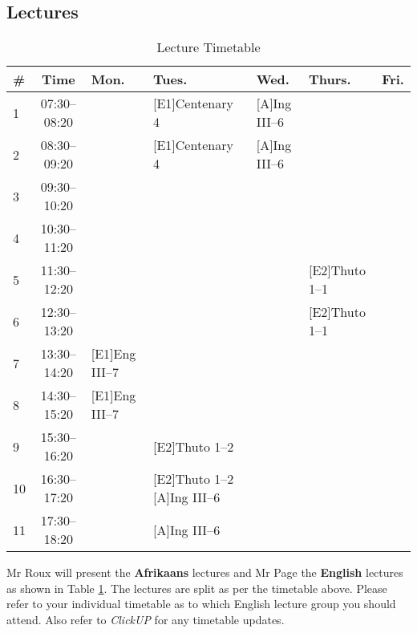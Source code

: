     \subsection{Lectures}
        \begin{table}[!h]
            \begin{center}
             \begin{tabular}{|l|c|p{2.5cm}|p{2.9cm}|p{2.1cm}|p{2.6cm}|p{0.6cm}|}
                 \hline
                 {\bf \#} & {\bf Time} & {\bf Mon.} & {\bf Tues.} & {\bf Wed.} &
                 {\bf Thurs.} & {\bf Fri.} \\
                 \hline
                 1  & 07:30--08:20 &  & [E1]Centenary 4 & [A]Ing III--6 &  & \\ \hline
                 2  & 08:30--09:20 &  & [E1]Centenary 4 & [A]Ing III--6 &  & \\ \hline
                 3  & 09:30--10:20 &  &  &  &  & \\ \hline
                 4  & 10:30--11:20 &  &  &  &  & \\ \hline
                 5  & 11:30--12:20 &  &  &  & [E2]Thuto 1--1 & \\ \hline
                 6  & 12:30--13:20 &  &  &  & [E2]Thuto 1--1 & \\ \hline
                 7  & 13:30--14:20 & [E1]Eng III--7 &  &  &  & \\ \hline
                 8  & 14:30--15:20 & [E1]Eng III--7 &  &  &  & \\ \hline
                 9  & 15:30--16:20 &  & [E2]Thuto 1--2 &  &  & \\ \hline
                 10 & 16:30--17:20 &  & [E2]Thuto 1--2 [A]Ing III--6 &  &  & \\ \hline
                 11 & 17:30--18:20 &  & [A]Ing III--6 &  &  & \\
                 \hline
             \end{tabular}
             \caption{Lecture Timetable}
            \label{tab:lectures}
            \end{center}
        \end{table}

        Mr Roux will present the \textbf{Afrikaans} lectures and Mr Page the
        \textbf{English} lectures as shown in Table \ref{tab:lectures}. The
        lectures are split as per the timetable above. Please refer to your
        individual timetable as to which English lecture group you should
        attend. Also refer to {\it ClickUP} for any timetable updates.

